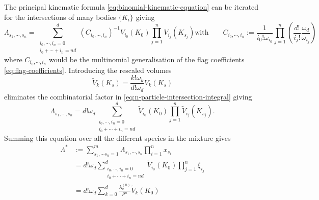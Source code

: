\documentclass[11pt,twoside]{report}
\begin{document}
The principal kinematic formula \eqref{eq:binomial-kinematic-equation} can be iterated for the intersections of many bodies $\{K_i\}$ giving \cite{Santalo2004,MarechalPRE2014}
\begin{subequations}\label{eq:multinomial-kinematic-equation}
  \begin{equation}
    \Lambda_{s_1, \cdots, s_n}
    =
      \sum_{\substack{i_0, \cdots, i_n = 0 \\ i_0 + \cdots + i_n = nd}}^d
      (C_{i_0, \cdots, i_n})^{-1}
      V_{i_0}(K_0)
      \prod_{j=1}^n
      V_{i_j}(K_{s_j})
  \end{equation}
  \begin{equation}
    \textrm{with} \qquad
    C_{i_0, \cdots, i_n}
    := \frac{1}{i_0! \omega_{i_0}}
    \prod_{j=1}^n
    \left(
    \frac{d!}{i_j!} \frac{\omega_d}{\omega_{i_j}}
    \right)
  \end{equation}
\end{subequations}
where $C_{i_0, \cdots, i_n}$ would be the multinomial generalisation of the flag coefficients \eqref{eq:flag-coefficients}.
Introducing the rescaled volumes
\begin{equation}\label{eq:rescaled-intrinsic-volumes}
  \widetilde{V}_k(K_s)
  =
  \frac{k! \omega_k}{d! \omega_d} V_k(K_s)
\end{equation}
eliminates the combinatorial factor in \eqref{eq:n-particle-intersection-integral} giving
\begin{equation}\label{eq:lambda-reduced}
  \Lambda_{s_1, \cdots, s_n}
  =
  d! \omega_d
  \sum_{\substack{i_0, \cdots, i_n = 0 \\ i_0 + \cdots + i_n = nd}}^d
  \widetilde{V}_{i_0}(K_0)
  \prod_{j=1}^n
  \widetilde{V}_{i_j}(K_{s_j}).
\end{equation}
Summing this equation over all the different species in the mixture gives
\begin{equation}
  \label{eq:final-lambda}
  \begin{split}
    \Lambda^*
    & :=
    \sum_{s_1, \cdots s_n = 1}^m
    \Lambda_{s_1, \cdots, s_n}
    \prod_{i=1}^n x_{s_i}
    \\ &=
    d! \omega_d
    \sum_{\substack{i_0, \cdots, i_n = 0 \\ i_0 + \cdots + i_n = nd}}^d
    \widetilde{V}_{i_0}(K_0)
    \prod_{j=1}^n
    \xi_{i_j}
    \\ &=
    d! \omega_d
    \sum_{k = 0}^d
    \frac{\lambda_k^{(n)}}{\rho^n}
    \widetilde{V}_{k}(K_0)
  \end{split}
\end{equation}
\end{document}
